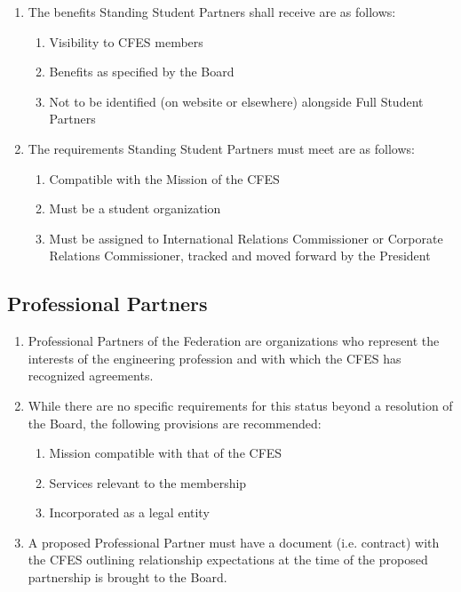 \begin{enumerate}
 \item
  The benefits Standing Student Partners shall receive are as follows:

  \begin{enumerate}
   \item
    Visibility to CFES members
   \item
    Benefits as specified by the Board
   \item
    Not to be identified (on website or elsewhere) alongside Full Student Partners
  \end{enumerate}

 \item
  The requirements Standing Student Partners must meet are as follows:

  \begin{enumerate}
   \item
    Compatible with the Mission of the CFES
   \item
    Must be a student organization
   \item
    Must be assigned to International Relations Commissioner or Corporate Relations Commissioner, tracked and moved forward by the President
  \end{enumerate}
\end{enumerate}

\subsection{Professional Partners}
\label{professional-partners}

\begin{enumerate}
 \item
  Professional Partners of the Federation are organizations who represent the interests of the engineering profession and with which the CFES has recognized agreements.
 \item
  While there are no specific requirements for this status beyond a resolution of the Board, the following provisions are recommended:

  \begin{enumerate}
   \item
    Mission compatible with that of the CFES
   \item
    Services relevant to the membership
   \item
    Incorporated as a legal entity
  \end{enumerate}

 \item
  A proposed Professional Partner must have a document (i.e. contract) with the CFES outlining relationship expectations at the time of the proposed partnership is brought to the Board.
\end{enumerate}

